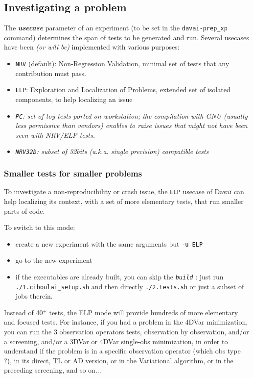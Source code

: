 \documentclass[a4paper,10pt,twoside]{article}
\begin{document}
\subsection{\label{sect:investigating}Investigating a problem}

The \textit{\textbf{usecase}} parameter of an experiment (to be set in the \texttt{davai-prep\_xp} command) determines the span of tests to be generated and run. Several usecases have been \textit{(or will be)} implemented with various purposes:
  \begin{itemize}
   \item \texttt{NRV} (default): Non-Regression Validation, minimal set of tests that any contribution must pass.
   \item \texttt{ELP}: Exploration and Localization of Problems, extended set of isolated components, to help localizing an issue
   \item \textit{\texttt{PC}: set of toy tests ported on workstation; the compilation with GNU (usually less permissive than vendors) enables to raise issues that might not have been seen with NRV/ELP tests.}
   \item \textit{\texttt{NRV32b}: subset of 32bits (a.k.a. single precision) compatible tests}
  \end{itemize}

\subsubsection*{Smaller tests for smaller problems}

To investigate a non-reproducibility or crash issue, the \texttt{ELP} usecase of Davaï can help localizing its context, with a set of more elementary tests, that run smaller parts of code.

\noindent To switch to this mode:
\begin{itemize}
 \item create a new experiment with the same arguments but \texttt{-u ELP}
 \item go to the new experiment
 \item if the executables are already built, you can skip the \texttt{\textit{build}} : just run \texttt{./1.ciboulai\_setup.sh} and then directly \texttt{./2.tests.sh} or just a subset of jobs therein.
\end{itemize}

\noindent Instead of 40$^+$ tests, the ELP mode will provide hundreds of more elementary and focused tests. For instance, if you had a problem in the 4DVar minimization, you can run the 3 observation operators tests, observation by observation, and/or a screening, and/or a 3DVar or 4DVar single-obs minimization, in order to understand if the problem is in a specific observation operator (which obs type ?), in its direct, TL or AD version, or in the Variational algorithm, or in the preceding screening, and so on...
\end{document}
